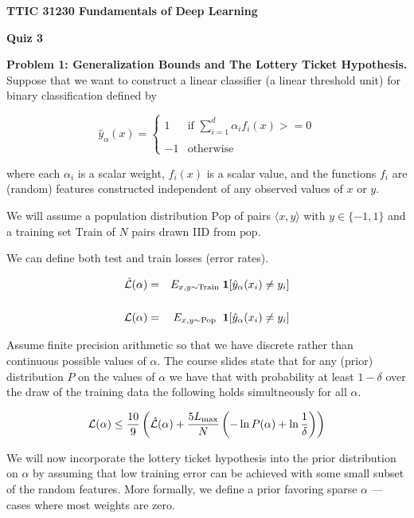 \documentclass{article}
\newcommand{\pop}{\mathrm{Pop}}
\newcommand{\train}{\mathrm{Train}}
\newcommand{\tuple}[1]{{\mbox{$\langle#1\rangle$}}}
\begin{document}
\centerline{\bf TTIC 31230 Fundamentals of Deep Learning}
\centerline{\bf Quiz 3}

\bigskip
    {\bf Problem 1: Generalization Bounds and The Lottery Ticket Hypothesis.}  Suppose that we want to construct a linear classifier (a linear threshold unit) for binary classification defined by

    $$\hat{y}_\alpha(x) = \left\{\begin{array}{ll} 1 & \mbox{if $\sum_{i = 1}^d \alpha_i f_i(x) >= 0$} \\ \\ -1 & \mbox{otherwise}\end{array}\right.$$

    where each $\alpha_i$ is a scalar weight, $f_i(x)$ is a scalar value, and the functions $f_i$ are (random) features constructed independent of any observed values of $x$ or $y$.

    We will assume a population distribution $\pop$ of pairs $\tuple{x,y}$ with $y \in \{-1,1\}$ and a training set $\mathrm{Train}$ of $N$ pairs drawn IID from $\mathrm{pop}$.

    We can define both test and train losses (error rates).

    \begin{eqnarray*}
      \hat{\cal L}(\alpha) & = & E_{{x,y} \sim \train}\;\mathbf{1}[\hat{y}_\alpha(x_i) \neq y_i] \\
      \\
      {\cal L}(\alpha) & = & E_{{x,y} \sim \pop}\;\;\mathbf{1}[\hat{y}_\alpha(x_i) \not = y_i] \\
    \end{eqnarray*}

    Assume finite precision arithmetic so that we have discrete rather than continuous possible values of $\alpha$.
    The course slides state that for any (prior) distribution $P$ on the values of $\alpha$ we have that with probability at least $1-\delta$
    over the draw of the training data the following holds simultneously for all $\alpha$.

    $${\cal L}(\alpha) \leq \frac{10}{9}\left(\hat{\cal L}(\alpha) + \frac{5L_\mathrm{max}}{N}\left(-\ln P(\alpha) + \ln \frac{1}{\delta}\right)\right)$$

    We will now incorporate the lottery ticket hypothesis into the prior distribution on $\alpha$ by assuming that low training error can be achieved with some small subset of the random features.
    More formally, we define a prior favoring sparse $\alpha$ --- cases where most weights are zero.
    
\end{document}
